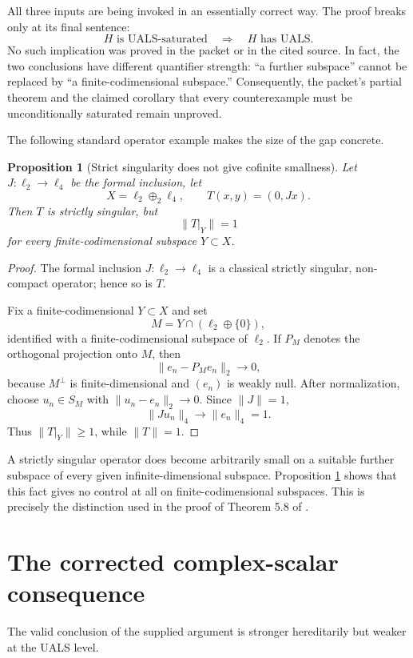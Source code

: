 \documentclass[11pt]{article}
\newtheorem{proposition}[theorem]{Proposition}
\theoremstyle{definition}
\theoremstyle{remark}
\begin{document}
All three inputs are being invoked in an essentially correct way.  The proof breaks only at its final sentence:
\[
  H\text{ is UALS-saturated}\quad\Longrightarrow\quad H\text{ has UALS}.
\]
No such implication was proved in the packet or in the cited source.  In fact, the two conclusions have different quantifier strength: ``a further subspace'' cannot be replaced by ``a finite-codimensional subspace.''  Consequently, the packet's partial theorem and the claimed corollary that every counterexample must be unconditionally saturated remain unproved.

The following standard operator example makes the size of the gap concrete.

\begin{proposition}[Strict singularity does not give cofinite smallness]\label{prop:J}
Let $J:\ell_2\to\ell_4$ be the formal inclusion, let
\[
  X=\ell_2\oplus_2\ell_4,
  \qquad
  T(x,y)=(0,Jx).
\]
Then $T$ is strictly singular, but
\[
  \|T|_Y\|=1
\]
for every finite-codimensional subspace $Y\subset X$.
\end{proposition}

\begin{proof}
The formal inclusion $J:\ell_2\to\ell_4$ is a classical strictly singular, non-compact operator; hence so is $T$.

Fix a finite-codimensional $Y\subset X$ and set
\[
  M=Y\cap(\ell_2\oplus\{0\}),
\]
identified with a finite-codimensional subspace of $\ell_2$.  If $P_M$ denotes the orthogonal projection onto $M$, then
\[
  \|e_n-P_Me_n\|_2\longrightarrow 0,
\]
because $M^\perp$ is finite-dimensional and $(e_n)$ is weakly null.  After normalization, choose $u_n\in S_M$ with $\|u_n-e_n\|_2\to0$.  Since $\|J\|=1$,
\[
  \|Ju_n\|_4\longrightarrow \|e_n\|_4=1.
\]
Thus $\|T|_Y\|\geq1$, while $\|T\|=1$.
\end{proof}

A strictly singular operator does become arbitrarily small on a suitable further subspace of every given infinite-dimensional subspace.  Proposition \ref{prop:J} shows that this fact gives no control at all on finite-codimensional subspaces.  This is precisely the distinction used in the proof of Theorem 5.8 of \cite{AGLM}.

\section{The corrected complex-scalar consequence}

The valid conclusion of the supplied argument is stronger hereditarily but weaker at the UALS level.
\end{document}
